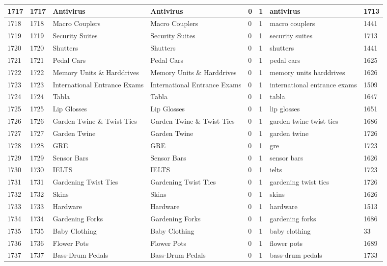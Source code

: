 \begin{longtable}{|l|l|l|l|l|l|l|l|}
1717 & 1717 & Antivirus & Antivirus & 0 & 1 & antivirus & 1713 \\ \hline 
1718 & 1718 & Macro Couplers & Macro Couplers & 0 & 1 & macro couplers & 1441 \\ \hline 
1719 & 1719 & Security Suites & Security Suites & 0 & 1 & security suites & 1713 \\ \hline 
1720 & 1720 & Shutters & Shutters & 0 & 1 & shutters & 1441 \\ \hline 
1721 & 1721 & Pedal Cars & Pedal Cars & 0 & 1 & pedal cars & 1625 \\ \hline 
1722 & 1722 & Memory Units \& Harddrives & Memory Units \& Harddrives & 0 & 1 & memory units harddrives & 1626 \\ \hline 
1723 & 1723 & International Entrance Exams & International Entrance Exams & 0 & 1 & international entrance exams & 1509 \\ \hline 
1724 & 1724 & Tabla & Tabla & 0 & 1 & tabla & 1647 \\ \hline 
1725 & 1725 & Lip Glosses & Lip Glosses & 0 & 1 & lip glosses & 1651 \\ \hline 
1726 & 1726 & Garden Twine \& Twist Ties & Garden Twine \& Twist Ties & 0 & 1 & garden twine twist ties & 1686 \\ \hline 
1727 & 1727 & Garden Twine & Garden Twine & 0 & 1 & garden twine & 1726 \\ \hline 
1728 & 1728 & GRE & GRE & 0 & 1 & gre & 1723 \\ \hline 
1729 & 1729 & Sensor Bars & Sensor Bars & 0 & 1 & sensor bars & 1626 \\ \hline 
1730 & 1730 & IELTS & IELTS & 0 & 1 & ielts & 1723 \\ \hline 
1731 & 1731 & Gardening Twist Ties & Gardening Twist Ties & 0 & 1 & gardening twist ties & 1726 \\ \hline 
1732 & 1732 & Skins & Skins & 0 & 1 & skins & 1626 \\ \hline 
1733 & 1733 & Hardware & Hardware & 0 & 1 & hardware & 1513 \\ \hline 
1734 & 1734 & Gardening Forks & Gardening Forks & 0 & 1 & gardening forks & 1686 \\ \hline 
1735 & 1735 & Baby Clothing & Baby Clothing & 0 & 1 & baby clothing & 33 \\ \hline 
1736 & 1736 & Flower Pots & Flower Pots & 0 & 1 & flower pots & 1689 \\ \hline 
1737 & 1737 & Bass-Drum Pedals & Bass-Drum Pedals & 0 & 1 & bass-drum pedals & 1733 \\ \hline 

\end{longtable}
